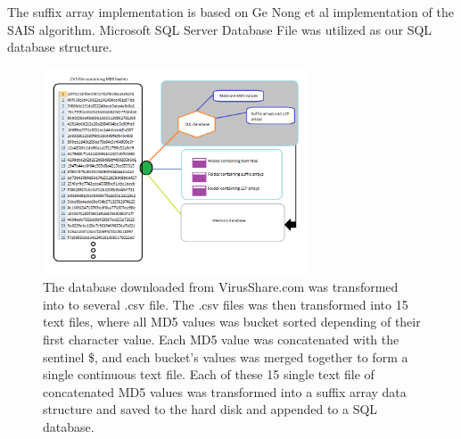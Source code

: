 \documentclass[12pt]{article} %
\begin{document}
The suffix array implementation is based on  Ge Nong et al \cite{twoeffecient} implementation of the SAIS algorithm.  Microsoft SQL Server Database File was utilized as our SQL database structure.\\
\begin{figure}[H]
    \centering
    \includegraphics[width=0.7\textwidth]{databasecreation}
    \captionsetup{width=0.8\textwidth}
    \caption{The database downloaded from VirusShare.com \cite{virusshare} was transformed into to several .csv file. The .csv files was then transformed into 15 text files, where all MD5 values was bucket sorted depending of their first character value. Each MD5 value was concatenated with the sentinel \$, and each bucket's values was merged together to form a single continuous text file. Each of these 15 single text file of concatenated MD5 values was transformed into a suffix array data structure and saved to the hard disk and appended to a SQL database.}
    \label{fig:databasecreation}
\end{figure}
\end{document}
